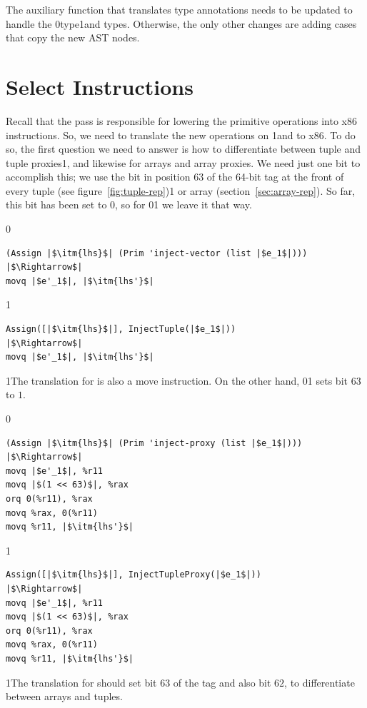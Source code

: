 \documentclass[7x10]{TimesAPriori_MIT}%
\def\racketEd{0}
\def\pythonEd{1}
\def\edition{1}
\newcommand{\racket}[1]{{\if\edition\racketEd{#1}\fi}}
\newcommand{\pythonColor}[0]{}
\newcommand{\python}[1]{{\if\edition\pythonEd\pythonColor #1\fi}}
\numberwithin{theorem}{chapter}
\numberwithin{definition}{chapter}
\numberwithin{equation}{chapter}
\begin{document}
The auxiliary function that translates type annotations needs to be
updated to handle the \PTUPLETYNAME{}
\racket{type}\python{and \PARRAYTYNAME{} types}.
%
Otherwise, the only other changes are adding cases that copy the new
AST nodes.

\section{Select Instructions}
\label{sec:select-instructions-gradual}

Recall that the  pass is responsible for
lowering the primitive operations into x86 instructions.  So, we need
to translate the new operations on \PTUPLETYNAME{} \python{and \PARRAYTYNAME{}}
to x86.  To do so, the first question we need to answer is how to
differentiate between tuple and tuple proxies\python{, and likewise for
arrays and array proxies}.  We need just one bit to accomplish this;
we use the bit in position $63$ of the 64-bit tag at the front of
every tuple (see figure~\ref{fig:tuple-rep})\python{ or array
(section~\ref{sec:array-rep})}. So far, this bit has been set to $0$,
so for \racket{}\python{} we leave
it that way.
{\if\edition\racketEd    
\begin{lstlisting}
(Assign |$\itm{lhs}$| (Prim 'inject-vector (list |$e_1$|)))
|$\Rightarrow$|  
movq |$e'_1$|, |$\itm{lhs'}$|
\end{lstlisting}
\fi}
{\if\edition\pythonEd\pythonColor    
\begin{lstlisting}
Assign([|$\itm{lhs}$|], InjectTuple(|$e_1$|))
|$\Rightarrow$|  
movq |$e'_1$|, |$\itm{lhs'}$|
\end{lstlisting}
\fi}
\python{The translation for  is also a move instruction.}
\noindent On the other hand,
\racket{}\python{} sets bit
$63$ to $1$.
%
{\if\edition\racketEd
\begin{lstlisting}  
(Assign |$\itm{lhs}$| (Prim 'inject-proxy (list |$e_1$|)))
|$\Rightarrow$|  
movq |$e'_1$|, %r11
movq |$(1 << 63)$|, %rax
orq 0(%r11), %rax
movq %rax, 0(%r11)
movq %r11, |$\itm{lhs'}$|
\end{lstlisting}
\fi}
{\if\edition\pythonEd\pythonColor
\begin{lstlisting}  
Assign([|$\itm{lhs}$|], InjectTupleProxy(|$e_1$|))
|$\Rightarrow$|  
movq |$e'_1$|, %r11
movq |$(1 << 63)$|, %rax
orq 0(%r11), %rax
movq %rax, 0(%r11)
movq %r11, |$\itm{lhs'}$|
\end{lstlisting}
\fi}
\python{\noindent The translation for  should set bit $63$
  of the tag and also bit $62$, to differentiate between arrays and tuples.}
\end{document}
